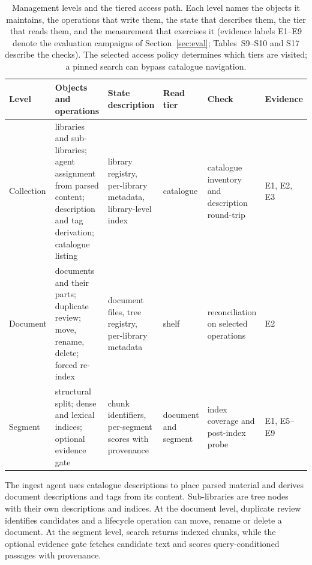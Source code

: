 \begin{table}[t]
\centering
\small
\setlength{\tabcolsep}{4pt}
\renewcommand{\arraystretch}{1.15}
\caption{Management levels and the tiered access path. Each level names the
objects it maintains, the operations that write them, the state that describes
them, the tier that reads them, and the measurement that exercises it
(evidence labels E1--E9 denote the evaluation campaigns of
Section~\ref{sec:eval}; Tables~S9--S10 and S17 describe the checks). The selected access
policy determines which tiers are visited; a pinned
search can bypass catalogue navigation.}
\label{tab:levels}
\begin{tabular}{@{}>{\raggedright\arraybackslash}p{}>{\raggedright\arraybackslash}p{}>{\raggedright\arraybackslash}p{}>{\raggedright\arraybackslash}p{}>{\raggedright\arraybackslash}p{}>{\raggedright\arraybackslash}p{}@{}}
\toprule
Level & Objects and operations & State description & Read tier & Check & Evidence\\
\midrule
Collection & libraries and sub-libraries; agent assignment from parsed content; description and tag derivation; catalogue listing & library registry, per-library metadata, library-level index & catalogue & catalogue inventory and description round-trip & E1, E2, E3\\
Document & documents and their parts; duplicate review; move, rename, delete; forced re-index & document files, tree registry, per-library metadata & shelf & reconciliation on selected operations & E2\\
Segment & structural split; dense and lexical indices; optional evidence gate & chunk identifiers, per-segment scores with provenance & document and segment & index coverage and post-index probe & E1, E5--E9\\
\bottomrule
\end{tabular}
\end{table}

The ingest agent uses catalogue descriptions to place parsed material and
derives document descriptions and tags from its content. Sub-libraries are
tree nodes with their own descriptions and indices. At the document level,
duplicate review identifies candidates and a lifecycle operation can move,
rename or delete a document. At the segment level, search returns indexed
chunks, while the optional evidence gate fetches candidate text and scores
query-conditioned passages with provenance.


